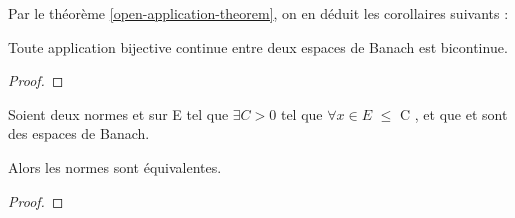 Par le théorème \ref{open-application-theorem}, on en déduit les corollaires
suivants :

\begin{corollary}
	Toute application bijective continue entre deux espaces de Banach est bicontinue.
\end{corollary}

\begin{proof}
	
\end{proof}

\begin{corollary}
	Soient deux normes  et  sur E tel que
	$\exists C > 0$ tel que $\forall x \in E$  $\leq$
	C , et que  et
	 sont des espaces de Banach.
	
	Alors les normes sont équivalentes.
\end{corollary}

\begin{proof}
	
\end{proof}
